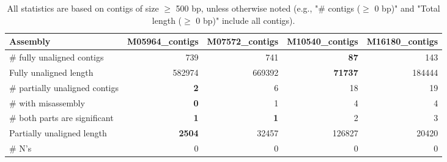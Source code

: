 \documentclass[12pt,a4paper]{article}
\begin{document}
\begin{table}[ht]
\begin{center}
\caption{All statistics are based on contigs of size $\geq$ 500 bp, unless otherwise noted (e.g., "\# contigs ($\geq$ 0 bp)" and "Total length ($\geq$ 0 bp)" include all contigs).}
\begin{tabular}{|l*{4}{|r}|}
\hline
Assembly & M05964\_contigs & M07572\_contigs & M10540\_contigs & M16180\_contigs \\ \hline
\# fully unaligned contigs & 739 & 741 & {\bf 87} & 143 \\ \hline
Fully unaligned length & 582974 & 669392 & {\bf 71737} & 184444 \\ \hline
\# partially unaligned contigs & {\bf 2} & 6 & 18 & 19 \\ \hline
\hspace{5mm}\# with misassembly & {\bf 0} & 1 & 4 & 4 \\ \hline
\hspace{5mm}\# both parts are significant & {\bf 1} & {\bf 1} & 2 & 3 \\ \hline
Partially unaligned length & {\bf 2504} & 32457 & 126827 & 20420 \\ \hline
\# N's & 0 & 0 & 0 & 0 \\ \hline
\end{tabular}
\end{center}
\end{table}
\end{document}
